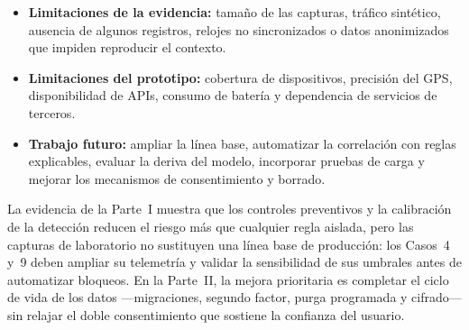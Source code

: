 \enlargethispage*{2\baselineskip}
\begin{itemize}[leftmargin=*, topsep=2pt, itemsep=2pt]
	\item \textbf{Limitaciones de la evidencia:} tamaño de las capturas, tráfico sintético, ausencia de algunos registros, relojes no sincronizados o datos anonimizados que impiden reproducir el contexto.
	\item \textbf{Limitaciones del prototipo:} cobertura de dispositivos, precisión del GPS, disponibilidad de APIs, consumo de batería y dependencia de servicios de terceros.
	\item {} \textbf{Trabajo futuro:} ampliar la línea base, automatizar la correlación con reglas explicables, evaluar la deriva del modelo, incorporar pruebas de carga y mejorar los mecanismos de consentimiento y borrado.
\end{itemize}

La evidencia de la Parte~I muestra que los controles preventivos y la calibración de la detección reducen el riesgo más que cualquier regla aislada, pero las capturas de laboratorio no sustituyen una línea base de producción: los Casos~4 y~9 deben ampliar su telemetría y validar la sensibilidad de sus umbrales antes de automatizar bloqueos. En la Parte~II, la mejora prioritaria es completar el ciclo de vida de los datos ---migraciones, segundo factor, purga programada y cifrado--- sin relajar el doble consentimiento que sostiene la confianza del usuario.
